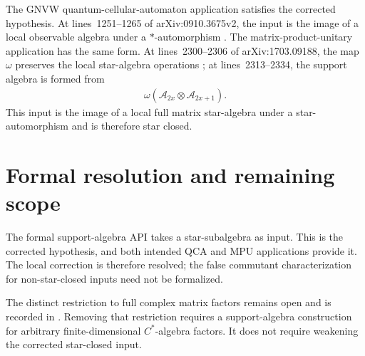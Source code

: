 \documentclass[11pt]{article}
\begin{document}
The GNVW quantum-cellular-automaton application satisfies the corrected
hypothesis. At lines~1251--1265 of arXiv:0910.3675v2, the input is the image
of a local observable algebra under a $*$-automorphism
\cite{Gross2012IndexTheory}. The matrix-product-unitary application has the
same form. At lines~2300--2306 of arXiv:1703.09188, the map $\omega$
preserves the local star-algebra operations \cite{Cirac2017MPU}; at
lines~2313--2334, the support algebra is formed from
\begin{align}
    \omega(\mathcal A_{2x}\otimes\mathcal A_{2x+1}).
    \label{eq:gnvw12_support_algebra_star_closure_mpu_input}
\end{align}
This input is the image of a local full matrix star-algebra under a
star-automorphism and is therefore star closed.

\section{Formal resolution and remaining scope}

The formal support-algebra API takes a star-subalgebra as input. This is the
corrected hypothesis, and both intended QCA and MPU applications provide it.
The local correction is therefore resolved; the false commutant
characterization for non-star-closed inputs need not be formalized.

The distinct restriction to full complex matrix factors remains open and is
recorded in
. Removing
that restriction requires a support-algebra construction for arbitrary
finite-dimensional $C^*$-algebra factors. It does not require weakening the
corrected star-closed input.



\end{document}
